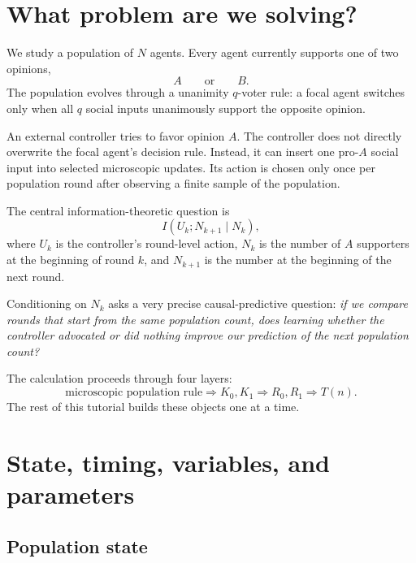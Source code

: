\documentclass[11pt,a4paper]{article}
\newcommand{\1}{\mathbbm{1}}
\begin{document}
\tableofcontents
\newpage

\section{What problem are we solving?}

We study a population of $N$ agents. Every agent currently supports one of two opinions,
\[
A \qquad \text{or} \qquad B.
\]
The population evolves through a unanimity $q$-voter rule: a focal agent switches only when all $q$ social inputs unanimously support the opposite opinion.

An external controller tries to favor opinion $A$. The controller does not directly overwrite the focal agent's decision rule. Instead, it can insert one pro-$A$ social input into selected microscopic updates. Its action is chosen only once per population round after observing a finite sample of the population.

The central information-theoretic question is
\begin{equation}
I(U_k;N_{k+1}\mid N_k),
\label{eq:central_te}
\end{equation}
where $U_k$ is the controller's round-level action, $N_k$ is the number of $A$ supporters at the beginning of round $k$, and $N_{k+1}$ is the number at the beginning of the next round.

\begin{intuitionbox}
Conditioning on $N_k$ asks a very precise causal-predictive question: \emph{if we compare rounds that start from the same population count, does learning whether the controller advocated or did nothing improve our prediction of the next population count?}
\end{intuitionbox}

The calculation proceeds through four layers:
\[
\boxed{\text{microscopic population rule}}
\Longrightarrow
\boxed{K_0,K_1}
\Longrightarrow
\boxed{R_0,R_1}
\Longrightarrow
\boxed{T(n)}.
\]
The rest of this tutorial builds these objects one at a time.

\section{State, timing, variables, and parameters}

\subsection{Population state}
\end{document}
